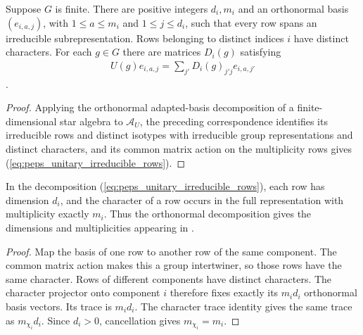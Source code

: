 \begin{lemma}
    \label{thm:peps_unitary_irreducible_blocks}
    \leanok
    Suppose $G$ is finite. There are positive integers $d_i,m_i$ and an
    orthonormal basis $(e_{i,a,j})$, with $1\leq a\leq m_i$ and
    $1\leq j\leq d_i$, such that every row spans an irreducible
    subrepresentation. Rows belonging to distinct indices $i$ have
    distinct characters. For each $g\in G$ there are matrices $D_i(g)$
    satisfying
    \begin{align}
        U(g)e_{i,a,j}=\sum_{j'}D_i(g)_{j'j}e_{i,a,j'}
        \label{eq:peps_unitary_irreducible_rows}
    \end{align}
    \cite[Sections~4.1 and~7]{Schuch2010PEPS}.
\end{lemma}

\begin{proof}\leanok
    Applying the orthonormal adapted-basis decomposition of a
    finite-dimensional star algebra to $\mathcal A_U$, the preceding
    correspondence identifies its irreducible rows and distinct isotypes with
    irreducible group representations and distinct characters, and its common
    matrix action on the multiplicity rows gives
    (\ref{eq:peps_unitary_irreducible_rows}).
\end{proof}

\begin{lemma}
    \label{thm:peps_unitary_character_blocks}
    \leanok
    In the decomposition (\ref{eq:peps_unitary_irreducible_rows}), each
    row has dimension $d_i$, and the character of a row occurs in the
    full representation with multiplicity exactly $m_i$.
    Thus the orthonormal decomposition gives the dimensions and
    multiplicities appearing in \cite[Lemma~4.4]{Schuch2010PEPS}.
\end{lemma}

\begin{proof}\leanok
    Map the basis of one row to another row of the same component.
    The common matrix action makes this a group intertwiner, so those
    rows have the same character. Rows of different components have
    distinct characters. The character projector onto component $i$
    therefore fixes exactly its $m_id_i$ orthonormal basis vectors.
    Its trace is $m_id_i$. The character trace identity gives the same
    trace as $m_{\chi_i}d_i$. Since $d_i>0$, cancellation gives
    $m_{\chi_i}=m_i$.
\end{proof}


